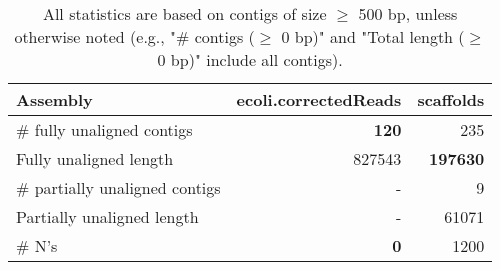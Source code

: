 \documentclass[12pt,a4paper]{article}
\begin{document}
\begin{table}[ht]
\begin{center}
\caption{All statistics are based on contigs of size $\geq$ 500 bp, unless otherwise noted (e.g., "\# contigs ($\geq$ 0 bp)" and "Total length ($\geq$ 0 bp)" include all contigs).}
\begin{tabular}{|l*{2}{|r}|}
\hline
Assembly & ecoli.correctedReads & scaffolds \\ \hline
\# fully unaligned contigs & {\bf 120} & 235 \\ \hline
Fully unaligned length & 827543 & {\bf 197630} \\ \hline
\# partially unaligned contigs & - & 9 \\ \hline
Partially unaligned length & - & 61071 \\ \hline
\# N's & {\bf 0} & 1200 \\ \hline
\end{tabular}
\end{center}
\end{table}
\end{document}
